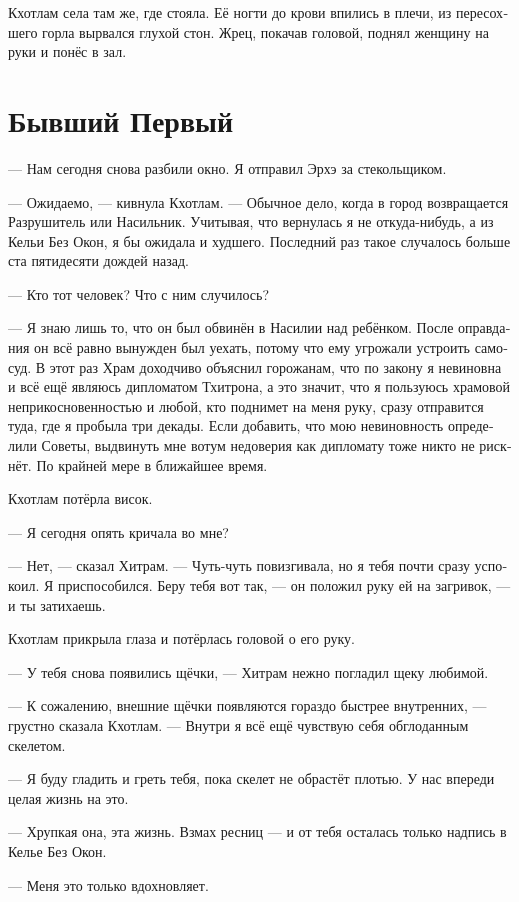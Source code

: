 \documentclass[a4paper,12pt,fleqn]{book}\usepackage{polyglossia}\setdefaultlanguage[babelshorthands=true]{russian}\setotherlanguage{english}\defaultfontfeatures{Ligatures=TeX,Mapping=tex-text}\usepackage{xcolor}\newcommand{\ml}[3]{#2}
\begin{document}
Кхотлам села там же, где стояла.
Её ногти до крови впились в плечи, из пересохшего горла вырвался глухой стон.
Жрец, покачав головой, поднял женщину на руки и понёс в зал.

\section{Бывший Первый}

--- Нам сегодня снова разбили окно.
Я отправил Эрхэ за стекольщиком.

--- Ожидаемо, --- кивнула Кхотлам.
--- Обычное дело, когда в город возвращается Разрушитель или Насильник.
Учитывая, что вернулась я не откуда-нибудь, а из Кельи Без Окон, я бы ожидала и худшего.
Последний раз такое случалось больше ста пятидесяти дождей назад.

--- Кто тот человек?
Что с ним случилось?

--- Я знаю лишь то, что он был обвинён в Насилии над ребёнком.
После оправдания он всё равно вынужден был уехать, потому что ему угрожали устроить самосуд.
В этот раз Храм доходчиво объяснил горожанам, что по закону я невиновна и всё ещё являюсь дипломатом Тхитрона, а это значит, что я пользуюсь храмовой неприкосновенностью и любой, кто поднимет на меня руку, сразу отправится туда, где я пробыла три декады.
Если добавить, что мою невиновность определили Советы, выдвинуть мне вотум недоверия как дипломату тоже никто не рискнёт.
По крайней мере в ближайшее время.

Кхотлам потёрла висок.

--- Я сегодня опять кричала во мне?

--- Нет, --- сказал Хитрам.
--- Чуть-чуть повизгивала, но я тебя почти сразу успокоил.
Я приспособился.
Беру тебя вот так, --- он положил руку ей на загривок, --- и ты затихаешь.

Кхотлам прикрыла глаза и потёрлась головой о его руку.

--- У тебя снова появились щёчки, --- Хитрам нежно погладил щеку любимой.

--- К сожалению, внешние щёчки появляются гораздо быстрее внутренних, --- грустно сказала Кхотлам.
--- Внутри я всё ещё чувствую себя обглоданным скелетом.

--- Я буду гладить и греть тебя, пока скелет не обрастёт плотью.
У нас впереди целая жизнь на это.

--- Хрупкая она, эта жизнь.
Взмах ресниц --- и от тебя осталась только надпись в Келье Без Окон.

--- Меня это только вдохновляет.
\end{document}
